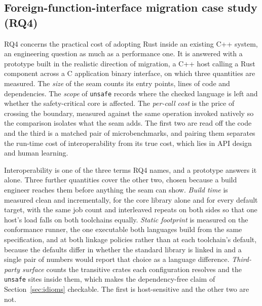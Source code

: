 \subsection{Foreign-function-interface migration case study (RQ4)}\label{sec:methodffi}
RQ4 concerns the practical cost of adopting Rust inside an existing C++ system, an engineering
question as much as a performance one. It is answered with a prototype built in the realistic
direction of migration, a C++ host calling a Rust component across a C application binary
interface, on which three quantities are measured. The \emph{size} of the seam counts its entry
points, lines of code and dependencies. The \emph{scope} of \texttt{unsafe} records where the
checked language is left and whether the safety-critical core is affected. The \emph{per-call
cost} is the price of crossing the boundary, measured against the same operation invoked
natively so the comparison isolates what the seam adds. The first two are read off the code and
the third is a matched pair of microbenchmarks, and pairing them separates the run-time cost of
interoperability from its true cost, which lies in API design and human learning.

Interoperability is one of the three terms RQ4 names, and a prototype answers it alone. Three
further quantities cover the other two, chosen because a build engineer reaches them before
anything the seam can show. \emph{Build time} is measured clean and incrementally, for the core
library alone and for every default target, with the same job count and interleaved repeats on
both sides so that one host's load falls on both toolchains equally. \emph{Static footprint} is
measured on the conformance runner, the one executable both languages build from the same
specification, and at both linkage policies rather than at each toolchain's default, because the
defaults differ in whether the standard library is linked in and a single pair of numbers would
report that choice as a language difference. \emph{Third-party surface} counts the transitive
crates each configuration resolves and the \texttt{unsafe} sites inside them, which makes the
dependency-free claim of Section~\ref{sec:idioms} checkable. The first is host-sensitive and the
other two are not.

